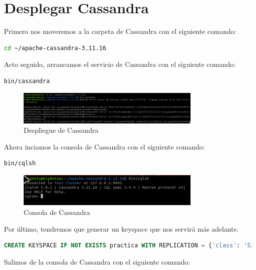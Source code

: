 \section{Desplegar Cassandra}

Primero nos moveremos a la carpeta de Cassandra con el siguiente comando:

\begin{lstlisting}[language=bash]
    cd ~/apache-cassandra-3.11.16
\end{lstlisting}

Acto seguido, arrancamos el servicio de Cassandra con el siguiente comando:

\begin{lstlisting}[language=bash]
    bin/cassandra
\end{lstlisting}

\begin{figure}[H]
    \centering
    \includegraphics[width=0.8\textwidth]{figures/11.png}
    \caption{Despliegue de Cassandra}
\end{figure}

Ahora inciamos la consola de Cassandra con el siguiente comando:

\begin{lstlisting}[language=bash]
    bin/cqlsh
\end{lstlisting}

\begin{figure}[H]
    \centering
    \includegraphics[width=0.8\textwidth]{figures/12.png}
    \caption{Consola de Cassandra}
\end{figure}

Por último, tendremos que generar un keyspace que nos servirá más adelante.

\begin{lstlisting}[language=sql]
    CREATE KEYSPACE IF NOT EXISTS practica WITH REPLICATION = {'class': 'SimpleStrategy', 'replication_factor': 1};
\end{lstlisting}

Salimos de la consola de Cassandra con el siguiente comando:

